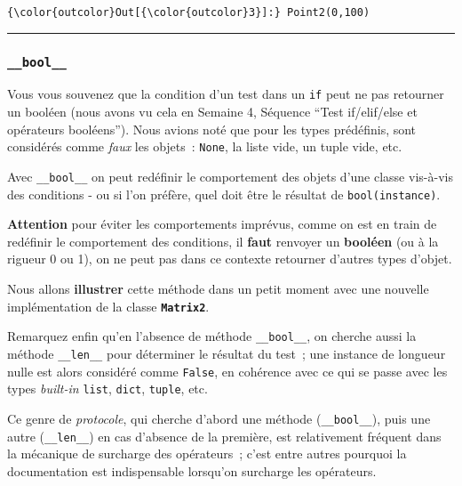 \begin{Verbatim}[commandchars=\\\{\}]
{\color{outcolor}Out[{\color{outcolor}3}]:} Point2(0,100)
\end{Verbatim}
            
    \begin{center}\rule{0.5\linewidth}{\linethickness}\end{center}

    \hypertarget{bool__}{%
\subsubsection{\texorpdfstring{\texttt{\_\_bool\_\_}}{\_\_bool\_\_}}\label{bool__}}

    Vous vous souvenez que la condition d'un test dans un \texttt{if} peut
ne pas retourner un booléen (nous avons vu cela en Semaine 4, Séquence
``Test if/elif/else et opérateurs booléens''). Nous avions noté que pour
les types prédéfinis, sont considérés comme \emph{faux} les objets~:
\texttt{None}, la liste vide, un tuple vide, etc.

Avec \texttt{\_\_bool\_\_} on peut redéfinir le comportement des objets
d'une classe vis-à-vis des conditions - ou si l'on préfère, quel doit
être le résultat de \texttt{bool(instance)}.

\textbf{Attention} pour éviter les comportements imprévus, comme on est
en train de redéfinir le comportement des conditions, il \textbf{faut}
renvoyer un \textbf{booléen} (ou à la rigueur 0 ou 1), on ne peut pas
dans ce contexte retourner d'autres types d'objet.

Nous allons \textbf{illustrer} cette méthode dans un petit moment avec
une nouvelle implémentation de la classe \textbf{\texttt{Matrix2}}.

Remarquez enfin qu'en l'absence de méthode \texttt{\_\_bool\_\_}, on
cherche aussi la méthode \texttt{\_\_len\_\_} pour déterminer le
résultat du test~; une instance de longueur nulle est alors considéré
comme \texttt{False}, en cohérence avec ce qui se passe avec les types
\emph{built-in} \texttt{list}, \texttt{dict}, \texttt{tuple}, etc.

Ce genre de \emph{protocole}, qui cherche d'abord une méthode
(\texttt{\_\_bool\_\_}), puis une autre (\texttt{\_\_len\_\_}) en cas
d'absence de la première, est relativement fréquent dans la mécanique de
surcharge des opérateurs~; c'est entre autres pourquoi la documentation
est indispensable lorsqu'on surcharge les opérateurs.

